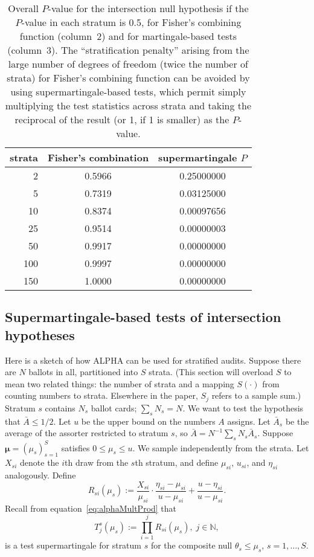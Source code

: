 \documentclass[aoas]{imsart}
\begin{document}
\begin{table} 
\centering
\begin{tabular}{r|cc} 
 strata & Fisher's combination & supermartingale $P$ \\
 \hline
2 & 0.5966 & 0.25000000 \\
5 & 0.7319 & 0.03125000 \\
10 & 0.8374 & 0.00097656 \\
25 & 0.9514 & 0.00000003 \\
50 & 0.9917 & 0.00000000 \\
100 & 0.9997 & 0.00000000 \\
150 & 1.0000 & 0.00000000 
\end{tabular} 
 \caption{\protect \label{tab:fisher} Overall $P$-value for the intersection null hypothesis if the $P$-value in each stratum is 0.5, for Fisher's combining function (column~2) and for martingale-based tests (column~3). 
 The ``stratification penalty'' arising from the large number of degrees of freedom (twice the number of strata) for Fisher's combining function can be avoided by using supermartingale-based tests, which permit simply multiplying the test statistics across strata and taking
 the reciprocal of the result  (or 1, if 1 is smaller) as the $P$-value.}
 \end{table}

\subsection{Supermartingale-based tests of intersection hypotheses} \label{sec:supermartingale-intersection}
Here is a sketch of how ALPHA can be used for stratified audits.
Suppose there are $N$ ballots in all, partitioned into $S$ strata.
(This section will overload $S$ to mean two related things: the number of strata and
a mapping $S(\cdot)$ from counting numbers to strata. 
Elsewhere in the paper, $S_j$ refers to a sample sum.)
Stratum $s$ contains $N_s$ ballot cards; $\sum_s N_s = N$.
We want to test the hypothesis that $\bar{A} \le 1/2$.
Let $u$ be the upper bound on the numbers $A$ assigns.
Let $\bar{A}_s$ be the average of the assorter restricted to stratum $s$, so
$\bar{A} = N^{-1}\sum_s N_s \bar{A}_s$.
Suppose $\boldsymbol{\mu} = (\mu_s)_{s=1}^S$ satisfies $0 \le \mu_s \le u$.
We sample independently from the strata.
Let $X_{si}$ denote the $i$th draw from the $s$th stratum, and define $\mu_{si}$, $u_{si}$, and $\eta_{si}$ analogously.
Define
\begin{equation}
   R_{si}(\mu_s) := \frac{X_{si}}{\mu_{si}} \cdot \frac{\eta_{si}-\mu_{si}}{u-\mu_{si}} + \frac{u-\eta_{si}}{u-\mu_{si}}.
 \end{equation}
Recall from equation~\ref{eq:alphaMultProd} that
\begin{equation} 
T_j^s(\mu_s) := \prod_{i=1}^j R_{si}(\mu_s), \; j \in \mathbb{N},
\end{equation}
is a test supermartingale for stratum $s$ for the composite null $\theta_s \le \mu_s$, $s=1, \ldots, S$.
\end{document}
